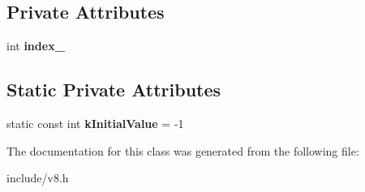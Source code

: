 \subsection*{Private Attributes}
\begin{DoxyCompactItemize}
\item 
int {\bfseries index\+\_\+}\hypertarget{classv8_1_1_eternal_ad186efc74d3640ebef961abc1f7430cf}{}\label{classv8_1_1_eternal_ad186efc74d3640ebef961abc1f7430cf}

\end{DoxyCompactItemize}
\subsection*{Static Private Attributes}
\begin{DoxyCompactItemize}
\item 
static const int {\bfseries k\+Initial\+Value} = -\/1\hypertarget{classv8_1_1_eternal_adfc0b4ef32d5926b58b0b216eb051298}{}\label{classv8_1_1_eternal_adfc0b4ef32d5926b58b0b216eb051298}

\end{DoxyCompactItemize}


The documentation for this class was generated from the following file\+:\begin{DoxyCompactItemize}
\item 
include/v8.\+h\end{DoxyCompactItemize}
